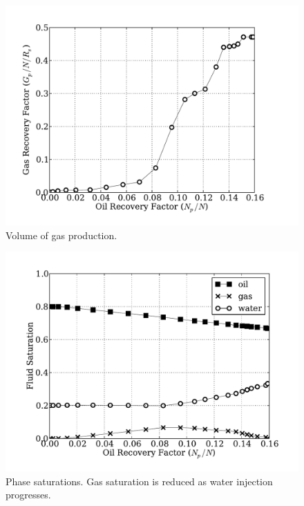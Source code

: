 \documentclass[final,authoryear,5p,times,twocolumn,10pt]{elsarticle}
\begin{document}
\begin{figure}
\centering
\includegraphics[width=\linewidth]{./python/matbal_gas}
\caption{Volume of gas production.}
\label{fig: matbal_gas}
\end{figure}

\begin{figure}
\centering
\includegraphics[width=\linewidth]{./python/matbal_S}
\caption{Phase saturations. Gas saturation is reduced as water injection progresses.}
\label{fig: matbal_s}
\end{figure}
\end{document}
